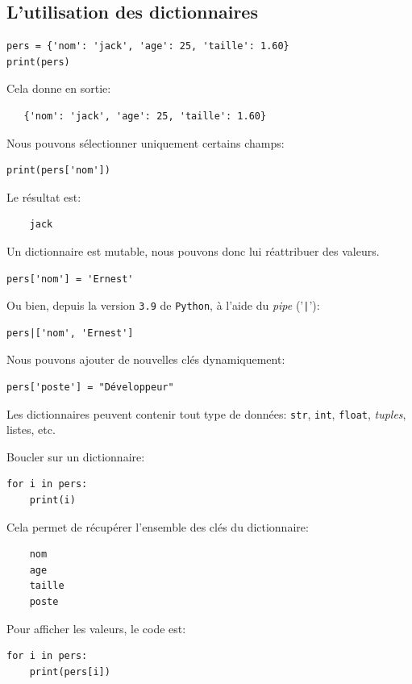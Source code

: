 \documentclass[a4paper,12pt]{book}
\begin{document}
\subsection*{L'utilisation des dictionnaires}\label{utilisation_dict}
\begin{lstlisting}
pers = {'nom': 'jack', 'age': 25, 'taille': 1.60}
print(pers)
\end{lstlisting}
\medskip

Cela donne en sortie:
\begin{verbatim}
   {'nom': 'jack', 'age': 25, 'taille': 1.60} 
\end{verbatim}
\medskip

Nous pouvons sélectionner uniquement certains champs:
\begin{lstlisting}
print(pers['nom'])
\end{lstlisting}
\medskip

Le résultat est:
\begin{verbatim}
    jack
\end{verbatim}
\medskip

Un dictionnaire est mutable, nous pouvons donc lui réattribuer des valeurs.
\begin{lstlisting}
pers['nom'] = 'Ernest'
\end{lstlisting}
\medskip

Ou bien, depuis la version \texttt{3.9} de \texttt{Python}, à l'aide du \og \textit{pipe}\fg{} ('\texttt{|}'):
\begin{lstlisting}
pers|['nom', 'Ernest']
\end{lstlisting}
\medskip

Nous pouvons ajouter de nouvelles clés dynamiquement:
\begin{lstlisting}
pers['poste'] = "Développeur"
\end{lstlisting}
\medskip

Les dictionnaires peuvent contenir tout type de données: \texttt{str}, \texttt{int}, \texttt{float}, \textit{tuples}, listes, etc.
\medskip

Boucler sur un dictionnaire:
\begin{lstlisting}
for i in pers:
    print(i)
\end{lstlisting}
\medskip

Cela permet de récupérer l'ensemble des clés du dictionnaire:
\begin{verbatim}
    nom
    age
    taille
    poste
\end{verbatim}
\medskip

Pour afficher les valeurs, le code est:
\begin{lstlisting}
for i in pers:
    print(pers[i])
\end{lstlisting}
\medskip
\end{document}
